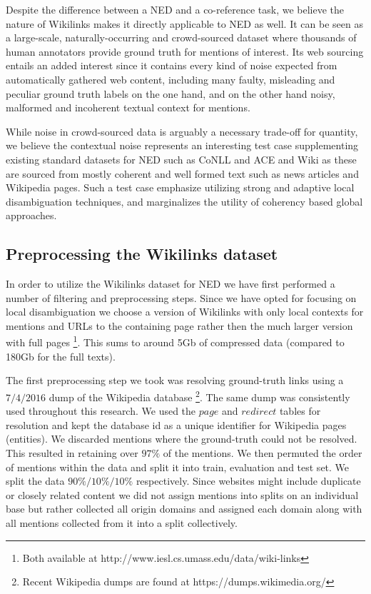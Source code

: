 \documentclass[11pt]{article}
\begin{document}
Despite the difference between a NED and a co-reference task, we believe the nature of Wikilinks makes it directly applicable to NED as well. It can be seen as a large-scale, naturally-occurring and crowd-sourced dataset where thousands of human annotators provide ground truth for mentions of interest. Its web sourcing entails an added interest since it contains every kind of noise expected from automatically gathered web content, including many faulty, misleading and peculiar ground truth labels on the one hand, and on the other hand noisy, malformed and incoherent textual context for mentions. 

While noise in crowd-sourced data is arguably a necessary trade-off for quantity, we believe the contextual noise represents an interesting test case supplementing existing standard datasets for NED such as CoNLL \cite{hoffart2011robust} and ACE and Wiki \cite{ratinov2011local} as these are sourced from mostly coherent and well formed text such as news articles and Wikipedia pages. Such a test case emphasize utilizing strong and adaptive local disambiguation techniques, and marginalizes the utility of coherency based global approaches.

\subsection{Preprocessing the Wikilinks dataset}

In order to utilize the Wikilinks dataset for NED we have first performed a number of filtering and preprocessing steps. Since we have opted for focusing on local disambiguation we choose a version of Wikilinks with only local contexts for mentions and URLs to the containing page rather then the much larger version with full pages \footnote{Both available at http://www.iesl.cs.umass.edu/data/wiki-links}. This sums to around 5Gb of compressed data (compared to 180Gb for the full texts).

The first preprocessing step we took was resolving ground-truth links using a $7/4/2016$ dump of the Wikipedia database \footnote{Recent Wikipedia dumps are found at https://dumps.wikimedia.org/}. The same dump was consistently used throughout this research. We used the $page$ and $redirect$ tables for resolution and kept the database id as a unique identifier for Wikipedia pages (entities). We discarded mentions where the ground-truth could not be resolved. This resulted in retaining over $97\%$ of the mentions. We then permuted the order of mentions within the data and split it into train, evaluation and test set. We split the data $90\% / 10\% / 10\%$ respectively. Since websites might include duplicate or closely related content we did not assign mentions into splits on an individual base but rather collected all origin domains and assigned each domain along with all mentions collected from it into a split collectively.
\end{document}
